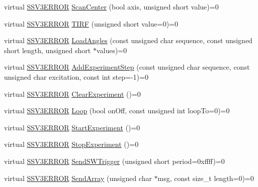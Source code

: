 \begin{DoxyCompactItemize}
\item 
virtual \hyperlink{classSSV3_1_1Controller_a8ff24a92ec373aa1257dcfe2aa2e5406}{S\-S\-V3\-E\-R\-R\-O\-R} \hyperlink{classSSV3_1_1Controller_adc4a8e3358176f977dfb37e1cb5bce86}{Scan\-Center} (bool axis, unsigned short value)=0
\item 
virtual \hyperlink{classSSV3_1_1Controller_a8ff24a92ec373aa1257dcfe2aa2e5406}{S\-S\-V3\-E\-R\-R\-O\-R} \hyperlink{classSSV3_1_1Controller_a3536d65f5a029b2794c8ebb50554c1f7}{T\-I\-R\-F} (unsigned short value=0)=0
\item 
virtual \hyperlink{classSSV3_1_1Controller_a8ff24a92ec373aa1257dcfe2aa2e5406}{S\-S\-V3\-E\-R\-R\-O\-R} \hyperlink{classSSV3_1_1Controller_a0717132af0002b8a4d1b21e591de1ca1}{Load\-Angles} (const unsigned char sequence, const unsigned short length, unsigned short $\ast$values)=0
\item 
virtual \hyperlink{classSSV3_1_1Controller_a8ff24a92ec373aa1257dcfe2aa2e5406}{S\-S\-V3\-E\-R\-R\-O\-R} \hyperlink{classSSV3_1_1Controller_af85ec395eb6d84916bb855088e294e06}{Add\-Experiment\-Step} (const unsigned char sequence, const unsigned char excitation, const int step=-\/1)=0
\item 
virtual \hyperlink{classSSV3_1_1Controller_a8ff24a92ec373aa1257dcfe2aa2e5406}{S\-S\-V3\-E\-R\-R\-O\-R} \hyperlink{classSSV3_1_1Controller_aa64e9f3148bfde53ac0d7169e308a696}{Clear\-Experiment} ()=0
\item 
virtual \hyperlink{classSSV3_1_1Controller_a8ff24a92ec373aa1257dcfe2aa2e5406}{S\-S\-V3\-E\-R\-R\-O\-R} \hyperlink{classSSV3_1_1Controller_aaeab781100d4fab7f921d1fbc22ea8e1}{Loop} (bool on\-Off, const unsigned int loop\-To=0)=0
\item 
virtual \hyperlink{classSSV3_1_1Controller_a8ff24a92ec373aa1257dcfe2aa2e5406}{S\-S\-V3\-E\-R\-R\-O\-R} \hyperlink{classSSV3_1_1Controller_a502e4fbb762a16a860b89836b3c1b402}{Start\-Experiment} ()=0
\item 
virtual \hyperlink{classSSV3_1_1Controller_a8ff24a92ec373aa1257dcfe2aa2e5406}{S\-S\-V3\-E\-R\-R\-O\-R} \hyperlink{classSSV3_1_1Controller_a418c6f3bee822914f68a4e4a75470aa3}{Stop\-Experiment} ()=0
\item 
virtual \hyperlink{classSSV3_1_1Controller_a8ff24a92ec373aa1257dcfe2aa2e5406}{S\-S\-V3\-E\-R\-R\-O\-R} \hyperlink{classSSV3_1_1Controller_a9e0bb5a0a1b4ebbf29ffdb21dc81f1b2}{Send\-S\-W\-Trigger} (unsigned short period=0xffff)=0
\item 
virtual \hyperlink{classSSV3_1_1Controller_a8ff24a92ec373aa1257dcfe2aa2e5406}{S\-S\-V3\-E\-R\-R\-O\-R} \hyperlink{classSSV3_1_1Controller_a421c2b50d9fe3bc93f8ec7e900a9d79a}{Send\-Array} (unsigned char $\ast$msg, const size\-\_\-t length=0)=0

\end{DoxyCompactItemize}
